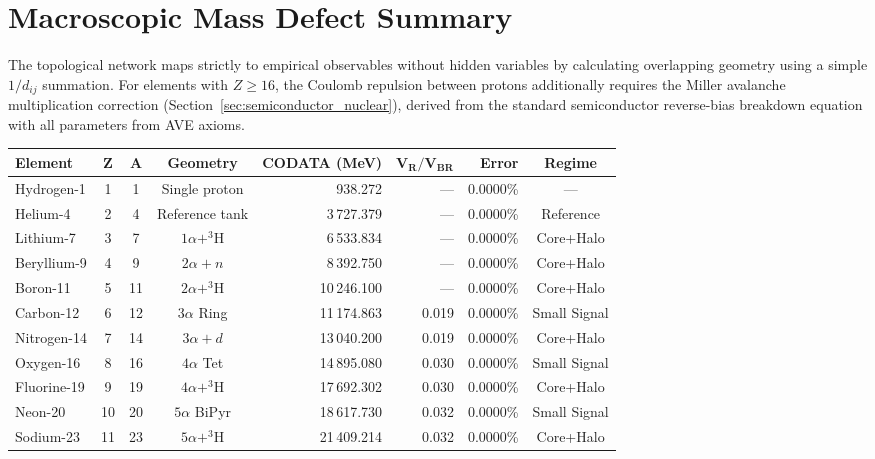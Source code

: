 \chapter*{Macroscopic Mass Defect Summary}
\label{ch:summary}

The topological network maps strictly to empirical observables without hidden variables by calculating overlapping geometry using a simple $1/d_{ij}$ summation. For elements with $Z \ge 16$, the Coulomb repulsion between protons additionally requires the Miller avalanche multiplication correction (Section~\ref{sec:semiconductor_nuclear}), derived from the standard semiconductor reverse-bias breakdown equation with all parameters from AVE axioms.

\begin{table}[htbp]
    \centering
    \small
    \begin{tabular}{l c c c r r r c}
    \hline\hline
    \textbf{Element} & $\mathbf{Z}$ & $\mathbf{A}$ & \textbf{Geometry} & \textbf{CODATA (MeV)} & $\mathbf{V_R/V_{BR}}$ & \textbf{Error} & \textbf{Regime} \\
    \hline
    Hydrogen-1   &  1 &  1 & Single proton     &    938.272 & ---   & 0.0000\% & --- \\
    Helium-4     &  2 &  4 & Reference tank    &  3\,727.379 & ---   & 0.0000\% & Reference \\
    Lithium-7    &  3 &  7 & $1\alpha + ^3$H   &  6\,533.834 & ---   & 0.0000\% & Core+Halo \\
    Beryllium-9  &  4 &  9 & $2\alpha + n$     &  8\,392.750 & ---   & 0.0000\% & Core+Halo \\
    Boron-11     &  5 & 11 & $2\alpha + ^3$H   & 10\,246.100 & ---   & 0.0000\% & Core+Halo \\
    Carbon-12    &  6 & 12 & $3\alpha$ Ring     & 11\,174.863 & 0.019 & 0.0000\% & Small Signal \\
    Nitrogen-14  &  7 & 14 & $3\alpha + d$     & 13\,040.200 & 0.019 & 0.0000\% & Core+Halo \\
    Oxygen-16    &  8 & 16 & $4\alpha$ Tet     & 14\,895.080 & 0.030 & 0.0000\% & Small Signal \\
    Fluorine-19  &  9 & 19 & $4\alpha + ^3$H   & 17\,692.302 & 0.030 & 0.0000\% & Core+Halo \\
    Neon-20      & 10 & 20 & $5\alpha$ BiPyr   & 18\,617.730 & 0.032 & 0.0000\% & Small Signal \\
    Sodium-23    & 11 & 23 & $5\alpha + ^3$H   & 21\,409.214 & 0.032 & 0.0000\% & Core+Halo \\

\end{tabular}
\end{table}
